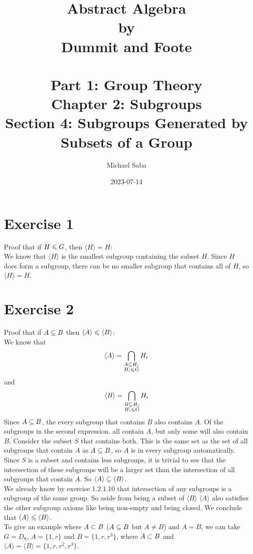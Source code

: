 \documentclass[12pt]{article}
\title{%
    \Huge Abstract Algebra \\
    \large by \\
    \Large Dummit and Foote \\~\\
    \huge Part 1: Group Theory \\
    \LARGE Chapter 2: Subgroups \\
    \Large Section 4: Subgroups Generated by Subsets of a Group
}
\date{2023-07-14}
\author{Michael Saba}
\begin{document}
    \maketitle
    \newpage
    \setlength{\parindent}{0pt}

    \section*{Exercise 1}
    Proof that if $H \leqslant G$, then $\langle H \rangle = H$: \\
    We know that $\langle H \rangle$ is the smallest subgroup
    containing the subset $H$.
    Since $H$ does form a subgroup, there can be no smaller
    subgroup that contains all of $H$, so $\langle H \rangle = H$.

    
    \section*{Exercise 2}
    Proof that if $A \subseteq B$
    then $\langle A \rangle \leqslant \langle B \rangle$: \\
    We know that
    \[ \langle A \rangle
    = \bigcap_{\substack{A \subseteq H_i \\ H_i \leqslant G}} H_i \]
    and
    \[ \langle B \rangle
    = \bigcap_{\substack{B \subseteq H_i \\ H_i \leqslant G}} H_i \]
    Since $A \subseteq B$,
    the every subgroup that contains $B$ also contains $A$.
    Of the subgroups in the second expression,
    all contain $A$, but only some will also contain $B$.
    Consider the subset $S$ that contains both.
    This is the same set as the set of all subgroups that contain
    $A$ as $A \subseteq B$,
    so $A$ is in every subgroup automatically.
    Since $S$ is a subset and contains less subgroups,
    it is trivial to see that the intersection of these subgroups
    will be a larger set than the intersection of all subgroups
    that contain $A$.
    So $\langle A \rangle \subseteq \langle B \rangle$. \\
    We already know by exercise 1.2.1.10 that intersection
    of any subgroups is a subgroup of the same group.
    So aside from being a subset of $\langle B \rangle$
    $\langle A \rangle$ also satisfies the other
    subgroup axioms like being non-empty and being closed.
    We conclude that $\langle A \rangle \leqslant \langle B \rangle$. \\
    To give an example where $A \subset B$
    ($A \subseteq B$ but $A \neq B$) and $A = B$,
    we can take $G = D_8$, $A = \{1, r\}$ and $B = \{1, r, r^3\}$,
    where $A \subset B$
    and $\langle A \rangle = \langle B \rangle = \{1, r, r^2, r^3\}$.
\end{document}
